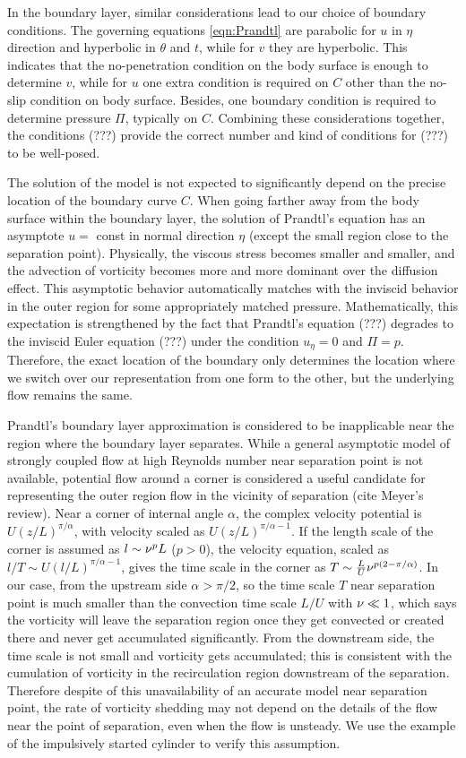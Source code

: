 In the boundary layer, similar considerations lead to our choice of boundary conditions.
The governing equations \eqref{eqn:Prandtl} are parabolic for $u$ in $\eta$ direction and hyperbolic in $\theta$ and $t$, while for $v$ they are hyperbolic. 
This indicates that the no-penetration condition on the body surface is enough to determine $v$, while for $u$ one extra condition is required on $C$ other than the no-slip condition on body surface. 
Besides, one boundary condition is required to determine pressure $\Pi$, typically on $C$.
Combining these considerations together, the conditions (???) provide the correct number and kind of conditions for (???) to be well-posed. 

The solution of the model is not expected to significantly depend on the precise location of the boundary curve $C$.
When going farther away from the body surface within the boundary layer, the solution of Prandtl's equation has an asymptote $u = $ const in normal direction $\eta$ (except the small region close to the separation point).
Physically, the viscous stress becomes smaller and smaller, and the advection of vorticity becomes more and more dominant over the diffusion effect.
This asymptotic behavior automatically matches with the inviscid behavior in the outer region for some appropriately matched pressure.
Mathematically, this expectation is strengthened by the fact that Prandtl's equation (???) degrades to the inviscid Euler equation (???) under the condition $u_\eta = 0$ and $\Pi = p$.
Therefore, the exact location of the boundary only determines the location where we switch over our representation from one form to the other, but the underlying flow remains the same.

Prandtl's boundary layer approximation is considered to be inapplicable near the region where the boundary layer separates. 
While a general asymptotic model of strongly coupled flow at high Reynolds number near separation point is not available, potential flow around a corner is considered a useful candidate for representing the outer region flow in the vicinity of separation (cite Meyer's review).
Near a corner of internal angle $\alpha$, the complex velocity potential is $U (z/L)^{\pi/\alpha}$, with velocity scaled as $U (z/L)^{\pi/\alpha-1}$.
If the length scale of the corner is assumed as $l \sim \nu^p L$ ($p > 0$), the velocity equation, scaled as $l/T \sim U(l/L)^{\pi/\alpha-1}$, gives the time scale in the corner as $T \sim \frac{L}{U} \nu^{p(2-\pi/\alpha)}$. 
In our case, from the upstream side $\alpha > \pi/2$, so the time scale $T$ near separation point is much smaller than the convection time scale $L/U$ with $\nu \ll 1$, which says the vorticity will leave the separation region once they get convected or created there and never get accumulated significantly. 
From the downstream side, the time scale is not small and vorticity gets accumulated; this is consistent with the cumulation of vorticity in the recirculation region downstream of the separation.
Therefore despite of this unavailability of an accurate model near separation point, the rate of vorticity shedding may not depend on the details of the flow near the point of separation, even when the flow is unsteady. 
We use the example of the impulsively started cylinder to verify this assumption.
